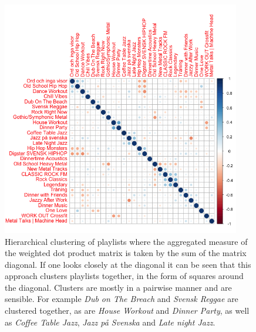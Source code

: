 \documentclass[a4paper,11pt]{kth-mag}
\begin{document}
\begin{figure}
\centering
\includegraphics[width=0.93\textwidth]{images/sum.png}
\caption{Hierarchical clustering of playlists where the aggregated measure of the weighted dot product matrix is taken by the sum of the matrix diagonal. If one looks closely at the diagonal it can be seen that this approach clusters playlists together, in the form of squares around the diagonal. Clusters are mostly in a pairwise manner and are sensible. For example \textit{Dub on The Breach} and \textit{Svensk Reggae} are clustered together, as are \textit{House Workout} and \textit{Dinner Party}, as well as \textit{Coffee Table Jazz}, \textit{Jazz p{\aa} Svenska} and \textit{Late night Jazz}.}
\label{sum}
\end{figure}
\end{document}

